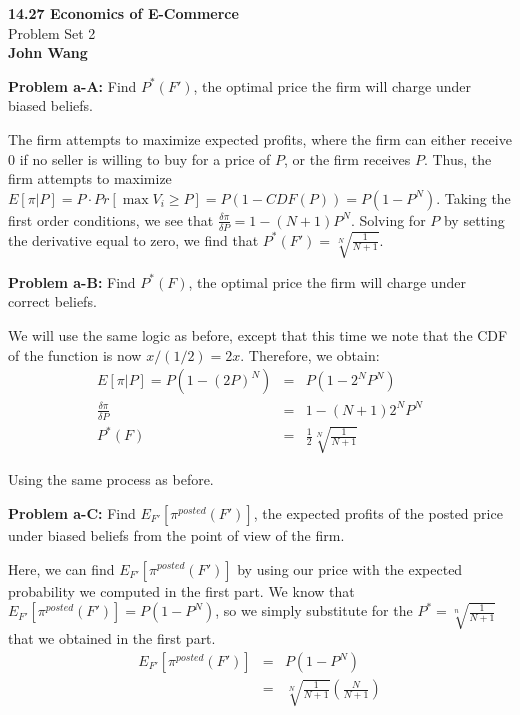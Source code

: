 \documentclass[psamsfonts]{amsart}
\newenvironment{sol}{\vspace{0.25cm}{\large \bfseries Solution:}}{\qedsymbol}
\newenvironment{prob}[1]{\begin{framed}{\large \bfseries Problem #1:}}{\end{framed}}
\newcommand{\makenewtitle}{
    \begin{center}
    {\huge \bfseries 14.27 Economics of E-Commerce} \\
    Problem Set 2\\
    \vspace{0.25cm}
    {\bfseries John Wang} 
    \end{center}
    \vspace{0.5cm}
}
\begin{document}
\makenewtitle

\begin{prob}{a-A}
Find $P^*(F')$, the optimal price the firm will charge under biased beliefs.
\end{prob}

\begin{sol}
The firm attempts to maximize expected profits, where the firm can either receive 0 if no seller is willing to buy for a price of $P$, or the firm receives $P$. Thus, the firm attempts to maximize $E[\pi | P] = P \cdot Pr[\max V_i \geq P]  = P (1 - CDF(P)) = P ( 1 - P^N)$. Taking the first order conditions, we see that $\frac{\delta \pi}{\delta P} = 1 - (N+1) P^N$. Solving for $P$ by setting the derivative equal to zero, we find that $P^*(F') = \sqrt[N]{\frac{1}{N+1}}$. 
\end{sol}

\begin{prob}{a-B}
Find $P^*(F)$, the optimal price the firm will charge under correct beliefs.
\end{prob}

\begin{sol}
We will use the same logic as before, except that this time we note that the CDF of the function is now $x/(1/2) = 2x$. Therefore, we obtain:
\begin{eqnarray}
E[ \pi | P] = P ( 1 - (2P)^N) &=& P ( 1- 2^N P^N) \\
\frac{ \delta \pi}{\delta P} &=& 1 - (N+1) 2^N P^N \\
P^*(F) &=& \frac{1}{2} \sqrt[N]{\frac{1}{N+1}}
\end{eqnarray}

Using the same process as before.
\end{sol}

\begin{prob}{a-C}
Find $E_{F'}[\pi^{posted}(F')]$, the expected profits of the posted price under biased beliefs from the point of view of the firm.
\end{prob}

\begin{sol}
Here, we can find $E_{F'}[\pi^{posted}(F')]$ by using our price with the expected probability we computed in the first part. We know that $E_{F'}[\pi^{posted}(F')] = P ( 1 - P^N)$, so we simply substitute for the $P^* = \sqrt[n]{\frac{1}{N+1}}$ that we obtained in the first part.
\begin{eqnarray}
E_{F'}[\pi^{posted}(F')] &=& P ( 1 - P^N) \\ 
&=& \sqrt[N]{\frac{1}{N+1}} \left( \frac{N}{N+1} \right)
\end{eqnarray}
\end{sol}
\end{document}
